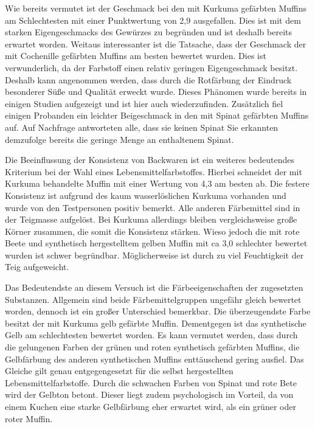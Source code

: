 \documentclass[11pt]{scrreprt}
\begin{document}
Wie bereits vermutet ist der Geschmack bei den mit Kurkuma gefärbten Muffins am Schlechtesten mit einer Punktwertung von 2,9 ausgefallen. Dies ist mit dem starken Eigengeschmacks des Gewürzes zu begründen und ist deshalb bereits erwartet worden. Weitaus interessanter ist die Tatsache, dass der Geschmack der mit Cochenille gefärbten Muffins am besten bewertet wurden. Dies ist verwunderlich, da der Farbstoff einen relativ geringen Eigengeschmack besitzt. Deshalb kann angenommen werden, dass durch die Rotfärbung der Eindruck besonderer Süße und Qualität erweckt wurde. Dieses Phänomen wurde bereits in einigen Studien aufgezeigt und ist hier auch wiederzufinden. Zusätzlich fiel einigen Probanden ein leichter Beigeschmack in den mit Spinat gefärbten Muffins auf. Auf Nachfrage antworteten alle, dass sie keinen Spinat  Sie erkannten demzufolge bereits die geringe Menge an enthaltenem Spinat.

Die Beeinflussung der Konsistenz von Backwaren ist ein weiteres bedeutendes Kriterium bei der Wahl eines Lebensmittelfarbstoffes. Hierbei schneidet der mit Kurkuma behandelte Muffin mit einer Wertung von 4,3 am besten ab. Die festere Konsistenz ist aufgrund des kaum wasserlöslichen Kurkuma vorhanden und wurde von den Testpersonen positiv bemerkt. Alle anderen  Färbemittel sind in der Teigmasse aufgelöst. Bei Kurkuma allerdings bleiben vergleichsweise große Körner zusammen, die somit die Konsistenz stärken. Wieso jedoch die mit rote Beete und synthetisch hergestelltem gelben Muffin mit ca 3,0 schlechter bewertet wurden ist schwer begründbar. Möglicherweise ist durch zu viel Feuchtigkeit der Teig aufgeweicht.

Das Bedeutendste an diesem Versuch ist die Färbeeigenschaften der zugesetzten Substanzen.
Allgemein sind beide Färbemittelgruppen ungefähr gleich bewertet worden, dennoch ist ein großer Unterschied bemerkbar. Die überzeugendste Farbe besitzt der mit Kurkuma gelb gefärbte Muffin. 
Dementgegen ist das synthetische Gelb am schlechtesten bewertet worden. Es kann vermutet werden, dass durch die gelungenen Farben der grünen und roten synthetisch gefärbten Muffins, die Gelbfärbung des anderen synthetischen Muffins enttäuschend gering ausfiel. Das Gleiche gilt genau entgegengesetzt für die selbst hergestellten Lebensmittelfarbstoffe. Durch die schwachen Farben von Spinat und rote Bete wird der Gelbton betont. Dieser liegt zudem psychologisch im Vorteil, da von einem Kuchen eine starke Gelbfärbung eher erwartet wird, als ein grüner oder roter Muffin.
\end{document}
